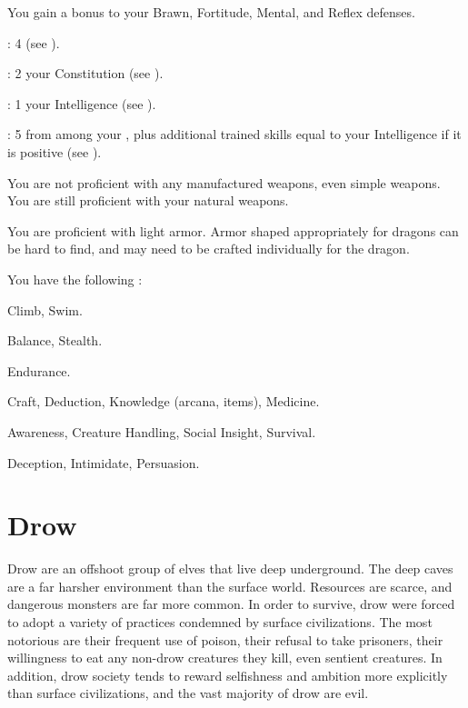      You gain a  bonus to your Brawn, Fortitude, Mental, and Reflex defenses.

      \begin{raggeditemize}
          \item {}: 4 (see ).
          \item {}: 2 \add your Constitution (see ).
          \item {}: 1 \add your Intelligence (see ).
          \item {}: 5 from among your , plus additional trained skills equal to your Intelligence if it is positive (see ).
      \end{raggeditemize}

      You are not proficient with any manufactured weapons, even simple weapons.
      You are still proficient with your natural weapons.

      You are proficient with light armor.
      Armor shaped appropriately for dragons can be hard to find, and may need to be crafted individually for the dragon.

      You have the following :
      \begin{raggeditemize}
        \item {} Climb, Swim.
        \item {} Balance, Stealth.
        \item {} Endurance.
        \item {} Craft, Deduction, Knowledge (arcana, items), Medicine.
        \item {} Awareness, Creature Handling, Social Insight, Survival.
        \item {} Deception, Intimidate, Persuasion.
      \end{raggeditemize}

\section{Drow}

  Drow are an offshoot group of elves that live deep underground.
  The deep caves are a far harsher environment than the surface world.
  Resources are scarce, and dangerous monsters are far more common.
  In order to survive, drow were forced to adopt a variety of practices condemned by surface civilizations.
  The most notorious are their frequent use of poison, their refusal to take prisoners, their willingness to eat any non-drow creatures they kill, even sentient creatures.
  In addition, drow society tends to reward selfishness and ambition more explicitly than surface civilizations, and the vast majority of drow are evil.

